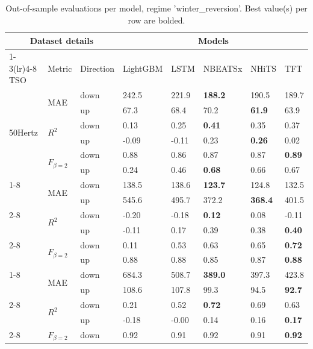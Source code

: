 \begin{table}
\caption{Out-of-sample evaluations per model, regime 'winter_reversion'. Best value(s) per row are bolded.}
\begin{tabular}{llllllll}
\toprule
\multicolumn{3}{c}{Dataset details} & \multicolumn{5}{c}{Models} \\
\cmidrule(lr){1-3}\cmidrule(lr){4-8}
TSO & Metric & Direction & LightGBM & LSTM & NBEATSx & NHiTS & TFT \\
\midrule
\multirow[t]{6}{*}{50Hertz} & \multirow[t]{2}{*}{MAE} & down & 242.5 & 221.9 & \textbf{188.2} & 190.5 & 189.7 \\
 &  & up & 67.3 & 68.4 & 70.2 & \textbf{61.9} & 63.9 \\
\cline{2-8}
 & \multirow[t]{2}{*}{$R^2$} & down & 0.13 & 0.25 & \textbf{0.41} & 0.35 & 0.37 \\
 &  & up & -0.09 & -0.11 & 0.23 & \textbf{0.26} & 0.02 \\
\cline{2-8}
 & \multirow[t]{2}{*}{$F_{\beta=2}$} & down & 0.88 & 0.86 & 0.87 & 0.87 & \textbf{0.89} \\
 &  & up & 0.24 & 0.46 & \textbf{0.68} & 0.66 & 0.67 \\
\cline{1-8} \cline{2-8}
\multirow[t]{6}{*}{Amprion} & \multirow[t]{2}{*}{MAE} & down & 138.5 & 138.6 & \textbf{123.7} & 124.8 & 132.5 \\
 &  & up & 545.6 & 495.7 & 372.2 & \textbf{368.4} & 401.5 \\
\cline{2-8}
 & \multirow[t]{2}{*}{$R^2$} & down & -0.20 & -0.18 & \textbf{0.12} & 0.08 & -0.11 \\
 &  & up & -0.11 & 0.17 & 0.39 & 0.38 & \textbf{0.40} \\
\cline{2-8}
 & \multirow[t]{2}{*}{$F_{\beta=2}$} & down & 0.11 & 0.53 & 0.63 & 0.65 & \textbf{0.72} \\
 &  & up & 0.88 & 0.88 & 0.85 & 0.87 & \textbf{0.88} \\
\cline{1-8} \cline{2-8}
\multirow[t]{6}{*}{TenneT DE} & \multirow[t]{2}{*}{MAE} & down & 684.3 & 508.7 & \textbf{389.0} & 397.3 & 423.8 \\
 &  & up & 108.6 & 107.8 & 99.3 & 94.5 & \textbf{92.7} \\
\cline{2-8}
 & \multirow[t]{2}{*}{$R^2$} & down & 0.21 & 0.52 & \textbf{0.72} & 0.69 & 0.63 \\
 &  & up & -0.18 & -0.00 & 0.14 & 0.16 & \textbf{0.17} \\
\cline{2-8}
 & \multirow[t]{2}{*}{$F_{\beta=2}$} & down & 0.92 & 0.91 & 0.92 & 0.91 & \textbf{0.92} \\

\end{tabular}
\end{table}
